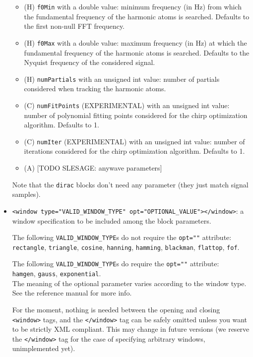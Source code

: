 \documentclass[11pt,a4paper]{article}
\begin{document}
\begin{itemize}
\begin{itemize}
  \item (H) \verb+f0Min+ with a double value: minimum frequency (in Hz) from
    which the fundamental frequency of the harmonic atoms is searched. Defaults
    to the first non-null FFT frequency.
    
  \item (H) \verb+f0Max+ with a double value: maximum frequency (in Hz) at
    which the fundamental frequency of the harmonic atoms is searched.
    Defaults to the Nyquist frequency of the considered signal.
    
  \item (H) \verb+numPartials+ with an unsigned int value: number of partials
    considered when tracking the harmonic atoms.
    
  \item (C) \verb+numFitPoints+ (EXPERIMENTAL) with an unsigned int value:
    number of polynomial fitting points considered for the chirp optimization
    algorithm. Defaults to 1.
    
  \item (C) \verb+numIter+ (EXPERIMENTAL) with an unsigned int value: number of
    iterations considered for the chirp optimization algorithm. Defaults to 1.

  \item (A) [TODO SLESAGE: anywave parameters]

  \end{itemize}
  Note that the \verb+dirac+ blocks don't need any parameter (they just match
  signal samples).
 
\item \verb+<window type="VALID_WINDOW_TYPE" opt="OPTIONAL_VALUE"></window>+: a
  window specification to be included among the block parameters.
  
  The following \verb+VALID_WINDOW_TYPE+s do not require the \verb+opt=""+
  attribute: \\ \verb+rectangle+, \verb+triangle+, \verb+cosine+, \verb+hanning+,
  \verb+hamming+, \verb+blackman+, \verb+flattop+, \verb+fof+.
  
  The following \verb+VALID_WINDOW_TYPE+s do require the \verb+opt=""+
  attribute: \\ \verb+hamgen+, \verb+gauss+, \verb+exponential+. \\
  The meaning of the optional parameter varies according to the window type.
  See the reference manual for more info.
  
  For the moment, nothing is needed between the opening and closing
  \verb+<window>+ tags, and the \verb+</window>+ tag can be safely omitted
  unless you want to be strictly XML compliant. This may change in future
  versions (we reserve the \verb+</window>+ tag for the case of specifying
  arbitrary windows, unimplemented yet).

\end{itemize}
\end{document}

